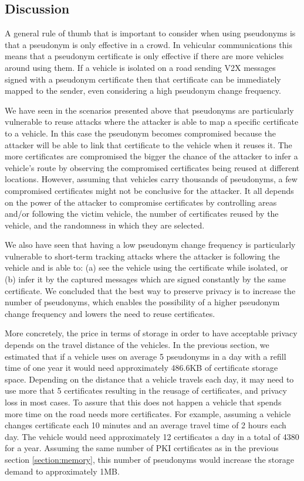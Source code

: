 			
			
			\subsection{Discussion}
			A general rule of thumb that is important to consider when using pseudonyms is that a pseudonym is only effective in a crowd. In vehicular communications this means that a pseudonym certificate is only effective if there are more vehicles around using them. If a vehicle is isolated on a road sending V2X messages signed with a pseudonym certificate then that certificate can be immediately mapped to the sender, even considering a high pseudonym change frequency.
			
			We have seen in the scenarios presented above that pseudonyms are particularly vulnerable to reuse attacks where the attacker is able to map a specific certificate to a vehicle. In this case the pseudonym becomes compromised because the attacker will be able to link that certificate to the vehicle when it reuses it. The more certificates are compromised the bigger the chance of the attacker to infer a vehicle's route by observing the compromised certificates being reused at different locations. However, assuming that vehicles carry thousands of pseudonyms, a few compromised certificates might not be conclusive for the attacker. It all depends on the power of the attacker to compromise certificates by controlling areas and/or following the victim vehicle, the number of certificates reused by the vehicle, and the randomness in which they are selected. 
			
			We also have seen that having a low pseudonym change frequency is particularly vulnerable to short-term tracking attacks where the attacker is following the vehicle and is able to: (a) see the vehicle using the certificate while isolated, or (b) infer it by the captured messages which are signed constantly by the same certificate. We concluded that the best way to preserve privacy is to increase the number of pseudonyms, which enables the possibility of a higher pseudonym change frequency and lowers the need to reuse certificates. 
			
			More concretely, the price in terms of storage in order to have acceptable privacy depends on the travel distance of the vehicles. In the previous section, we estimated that if a vehicle uses on average 5 pseudonyms in a day with a refill time of one year it would need approximately 486.6KB of certificate storage space. Depending on the distance that a vehicle travels each day, it may need to use more that 5 certificates resulting in the reusage of certificates, and privacy loss in most cases. To assure that this does not happen a vehicle that spends more time on the road needs more certificates. For example, assuming a vehicle changes certificate each 10 minutes and an average travel time of 2 hours each day. The vehicle would need approximately 12 certificates a day in a total of 4380 for a year. Assuming the same number of PKI certificates as in the previous section \ref{section:memory}, this number of pseudonyms would increase the storage demand to approximately 1MB.
			
